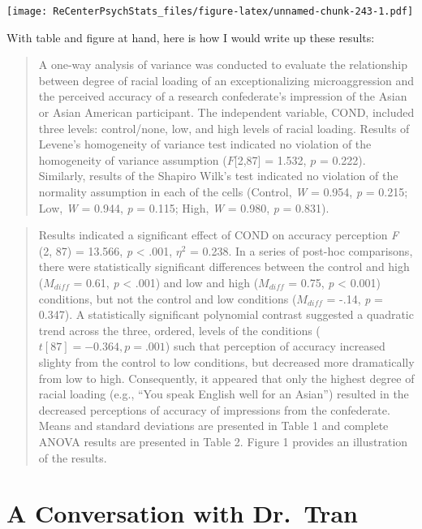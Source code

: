 \documentclass[
  11pt,
]{book}
\begin{document}
\texttt{[image: ReCenterPsychStats\_files/figure-latex/unnamed-chunk-243-1.pdf]}

With table and figure at hand, here is how I would write up these results:

\begin{quote}
A one-way analysis of variance was conducted to evaluate the relationship between degree of racial loading of an exceptionalizing microaggression and the perceived accuracy of a research confederate's impression of the Asian or Asian American participant. The independent variable, COND, included three levels: control/none, low, and high levels of racial loading. Results of Levene's homogeneity of variance test indicated no violation of the homogeneity of variance assumption (\(F\){[}2,87{]} = 1.532, \(p\) = 0.222). Similarly, results of the Shapiro Wilk's test indicated no violation of the normality assumption in each of the cells (Control, \emph{W} = 0.954, \emph{p} = 0.215; Low, \emph{W} = 0.944, \emph{p} = 0.115; High, \emph{W} = 0.980, \emph{p} = 0.831).
\end{quote}

\begin{quote}
Results indicated a significant effect of COND on accuracy perception \emph{F} (2, 87) = 13.566, \emph{p} \textless{} .001, \(\eta^2\) = 0.238. In a series of post-hoc comparisons, there were statistically significant differences between the control and high (\(M_{diff}\) = 0.61, \emph{p} \textless{} .001) and low and high (\(M_{diff}\) = 0.75, \emph{p} \textless{} 0.001) conditions, but not the control and low conditions (\(M_{diff}\) = -.14, \emph{p} = 0.347). A statistically significant polynomial contrast suggested a quadratic trend across the three, ordered, levels of the conditions (\(t[87] = -0.364, p = .001\)) such that perception of accuracy increased slighty from the control to low conditions, but decreased more dramatically from low to high. Consequently, it appeared that only the highest degree of racial loading (e.g., ``You speak English well for an Asian'') resulted in the decreased perceptions of accuracy of impressions from the confederate. Means and standard deviations are presented in Table 1 and complete ANOVA results are presented in Table 2. Figure 1 provides an illustration of the results.
\end{quote}

\hypertarget{a-conversation-with-dr.-tran}{%
\section{A Conversation with Dr.~Tran}\label{a-conversation-with-dr.-tran}}
\end{document}
